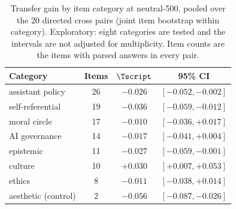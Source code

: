 \begin{table}[H]
\centering\small
\begin{tabular}{lccc}
\toprule
Category & Items & $\Tscript$ & 95\% CI \\
\midrule
assistant policy & 26 & $-0.026$ & $[-0.052, -0.002]$ \\
self-referential & 19 & $-0.036$ & $[-0.059, -0.012]$ \\
moral circle & 17 & $-0.010$ & $[-0.036, +0.017]$ \\
AI governance & 14 & $-0.017$ & $[-0.041, +0.004]$ \\
epistemic & 11 & $-0.027$ & $[-0.059, -0.001]$ \\
culture & 10 & $+0.030$ & $[+0.007, +0.053]$ \\
ethics & 8 & $-0.011$ & $[-0.038, +0.014]$ \\
aesthetic (control) & 2 & $-0.056$ & $[-0.087, -0.026]$ \\
\bottomrule
\end{tabular}
\caption{Transfer gain by item category at neutral-500, pooled over the 20 directed cross pairs (joint item bootstrap within category). Exploratory: eight categories are tested and the intervals are not adjusted for multiplicity. Item counts are the items with parsed answers in every pair.}
\label{tab:category}
\end{table}
